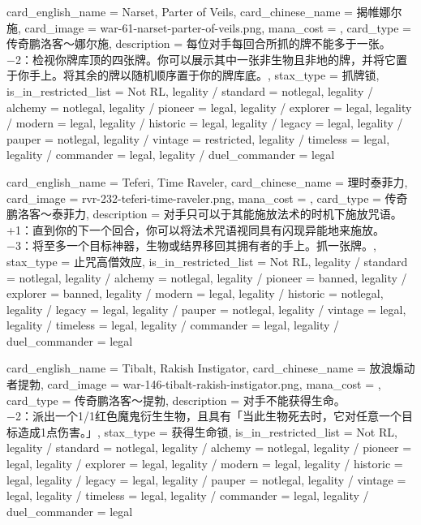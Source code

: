 \documentclass[lang = cn, color = black, 10pt]{AllThatStax}
\begin{document}
\card
{
	card_english_name = {Narset, Parter of Veils},
	card_chinese_name = {揭帷娜尔施},
	card_image = war-61-narset-parter-of-veils.png,
	mana_cost = ,
	card_type = 传奇鹏洛客～娜尔施,
	description = {每位对手每回合所抓的牌不能多于一张。\\
−2：检视你牌库顶的四张牌。你可以展示其中一张非生物且非地的牌，并将它置于你手上。将其余的牌以随机顺序置于你的牌库底。},
	stax_type = 抓牌锁,
	is_in_restricted_list = Not RL,
	legality / standard = notlegal,
	legality / alchemy = notlegal,
	legality / pioneer = legal,
	legality / explorer = legal,
	legality / modern = legal,
	legality / historic = legal,
	legality / legacy = legal,
	legality / pauper = notlegal,
	legality / vintage = restricted,
	legality / timeless = legal,
	legality / commander = legal,
	legality / duel_commander = legal
}

\card
{
	card_english_name = {Teferi, Time Raveler},
	card_chinese_name = {理时泰菲力},
	card_image = rvr-232-teferi-time-raveler.png,
	mana_cost = ,
	card_type = 传奇鹏洛客～泰菲力,
	description = {对手只可以于其能施放法术的时机下施放咒语。\\
+1：直到你的下一个回合，你可以将法术咒语视同具有闪现异能地来施放。\\
−3：将至多一个目标神器，生物或结界移回其拥有者的手上。抓一张牌。},
	stax_type = 止咒高僧效应,
	is_in_restricted_list = Not RL,
	legality / standard = notlegal,
	legality / alchemy = notlegal,
	legality / pioneer = banned,
	legality / explorer = banned,
	legality / modern = legal,
	legality / historic = notlegal,
	legality / legacy = legal,
	legality / pauper = notlegal,
	legality / vintage = legal,
	legality / timeless = legal,
	legality / commander = legal,
	legality / duel_commander = legal
}

\card
{
	card_english_name = {Tibalt, Rakish Instigator},
	card_chinese_name = {放浪煽动者提勃},
	card_image = war-146-tibalt-rakish-instigator.png,
	mana_cost = ,
	card_type = 传奇鹏洛客～提勃,
	description = {对手不能获得生命。\\
−2：派出一个1/1红色魔鬼衍生生物，且具有「当此生物死去时，它对任意一个目标造成1点伤害。」},
	stax_type = 获得生命锁,
	is_in_restricted_list = Not RL,
	legality / standard = notlegal,
	legality / alchemy = notlegal,
	legality / pioneer = legal,
	legality / explorer = legal,
	legality / modern = legal,
	legality / historic = legal,
	legality / legacy = legal,
	legality / pauper = notlegal,
	legality / vintage = legal,
	legality / timeless = legal,
	legality / commander = legal,
	legality / duel_commander = legal
}
\end{document}
